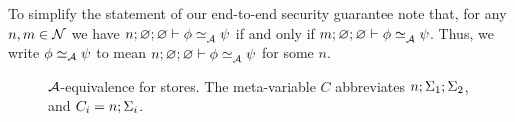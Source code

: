 To simplify the statement of our end-to-end security guarantee note that, for any $n, m \in \mathcal{N}$ we have $\loweq{n; \emptyenv; \emptyenv}{\Attacker}{\store}{\altstore}$ if and only if $\loweq{m; \emptyenv; \emptyenv}{\Attacker}{\store}{\altstore}$. Thus, we write $\phi \simeq_{\mathcal{A}} \psi$ to mean $\loweq{n; \emptyenv; \emptyenv}{\Attacker}{\store}{\altstore}$ for some $n$.

\begin{figure}
    \centering
    \caption{$\mathcal{A}$-equivalence for stores. The meta-variable $C$ abbreviates $n; \Sigma_1; \Sigma_2$, and $C_i = n; \Sigma_i$.}
    \label{fig:low-eq-memories}
\end{figure}


